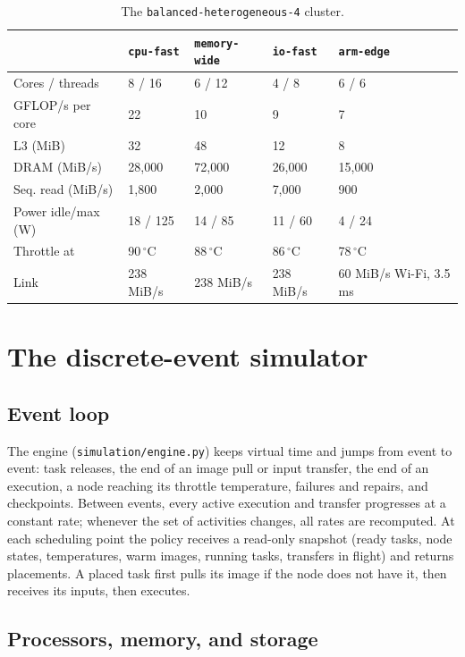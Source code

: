 \documentclass[12pt,a4paper]{report}
\begin{document}
\begin{table}[ht]
\centering
\small
\begin{tabular}{L{2.6cm}L{2.5cm}L{2.5cm}L{2.5cm}L{2.5cm}}
\toprule
 & \texttt{cpu-fast} & \texttt{memory-wide} & \texttt{io-fast} & \texttt{arm-edge} \\
\midrule
Cores / threads & 8 / 16 & 6 / 12 & 4 / 8 & 6 / 6 \\
GFLOP/s per core & 22 & 10 & 9 & 7 \\
L3 (MiB) & 32 & 48 & 12 & 8 \\
DRAM (MiB/s) & 28,000 & 72,000 & 26,000 & 15,000 \\
Seq. read (MiB/s) & 1,800 & 2,000 & 7,000 & 900 \\
Power idle/max (W) & 18 / 125 & 14 / 85 & 11 / 60 & 4 / 24 \\
Throttle at & 90\,$^\circ$C & 88\,$^\circ$C & 86\,$^\circ$C & 78\,$^\circ$C \\
Link & 238 MiB/s & 238 MiB/s & 238 MiB/s & 60 MiB/s Wi-Fi, 3.5 ms \\
\bottomrule
\end{tabular}
\caption{The \texttt{balanced-heterogeneous-4} cluster.}
\label{tab:nodes}
\end{table}

\section{The discrete-event simulator}
\label{sec:simulator}

\subsection{Event loop}

The engine (\texttt{simulation/engine.py}) keeps virtual time and jumps
from event to event: task releases, the end of an image pull or input
transfer, the end of an execution, a node reaching its throttle
temperature, failures and repairs, and checkpoints. Between events, every
active execution and transfer progresses at a constant rate; whenever the
set of activities changes, all rates are recomputed. At each scheduling
point the policy receives a read-only snapshot (ready tasks, node states,
temperatures, warm images, running tasks, transfers in flight) and returns
placements. A placed task first pulls its image if the node does not have
it, then receives its inputs, then executes.

\subsection{Processors, memory, and storage}
\end{document}
